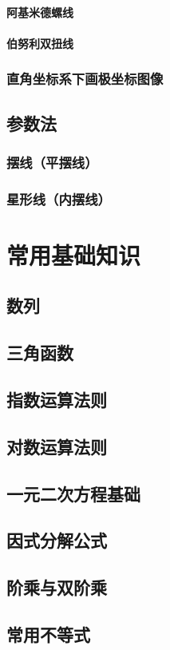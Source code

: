 \documentclass[UTF8, 12pt]{ctexart}
\begin{document}
\paragraph{阿基米德螺线}
\paragraph{伯努利双扭线}
\subsubsection{直角坐标系下画极坐标图像}
\subsection{参数法}
\subsubsection{摆线（平摆线）}
\subsubsection{星形线（内摆线）}
\section{常用基础知识}
\subsection{数列}
\subsection{三角函数}
\subsection{指数运算法则}
\subsection{对数运算法则}
\subsection{一元二次方程基础}
\subsection{因式分解公式}
\subsection{阶乘与双阶乘}
\subsection{常用不等式}
\end{document}
